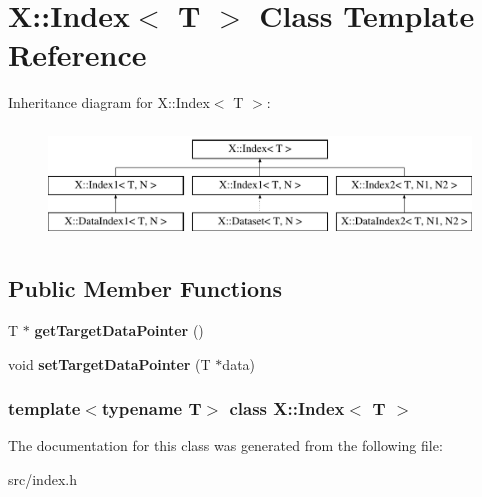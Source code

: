 \hypertarget{class_x_1_1_index}{\section{X\-:\-:Index$<$ T $>$ Class Template Reference}
\label{class_x_1_1_index}
}
Inheritance diagram for X\-:\-:Index$<$ T $>$\-:\begin{figure}[H]
\begin{center}
\leavevmode
\includegraphics[height=3.000000cm]{class_x_1_1_index}
\end{center}
\end{figure}
\subsection*{Public Member Functions}
\begin{DoxyCompactItemize}
\item 
\hypertarget{class_x_1_1_index_aa61272169a7dd0ab80ea7a7de771c62e}{T $\ast$ {\bfseries get\-Target\-Data\-Pointer} ()}\label{class_x_1_1_index_aa61272169a7dd0ab80ea7a7de771c62e}

\item 
\hypertarget{class_x_1_1_index_a1de180b669777c349047cb3ec10cca48}{void {\bfseries set\-Target\-Data\-Pointer} (T $\ast$data)}\label{class_x_1_1_index_a1de180b669777c349047cb3ec10cca48}

\end{DoxyCompactItemize}
\subsubsection*{template$<$typename T$>$ class X\-::\-Index$<$ T $>$}



The documentation for this class was generated from the following file\-:\begin{DoxyCompactItemize}
\item 
src/index.\-h\end{DoxyCompactItemize}
